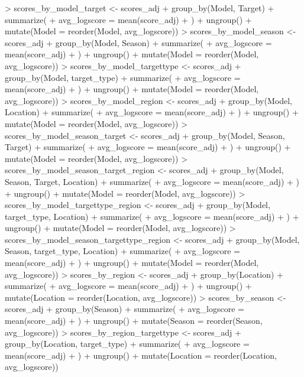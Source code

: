 \documentclass{article}
\begin{document}
\begin{Schunk}
\begin{Sinput}
> scores_by_model_target <- scores_adj %
+     group_by(Model, Target) %
+     summarize(
+         avg_logscore = mean(score_adj)
+     ) %
+     ungroup() %
+     mutate(Model = reorder(Model, avg_logscore))
> scores_by_model_season <- scores_adj %
+     group_by(Model, Season) %
+     summarize(
+         avg_logscore = mean(score_adj)
+     ) %
+     ungroup() %
+     mutate(Model = reorder(Model, avg_logscore))
> scores_by_model_targettype <- scores_adj %
+     group_by(Model, target_type) %
+     summarize(
+         avg_logscore = mean(score_adj)
+     ) %
+     ungroup() %
+     mutate(Model = reorder(Model, avg_logscore))
> scores_by_model_region <- scores_adj %
+     group_by(Model, Location) %
+     summarize(
+         avg_logscore = mean(score_adj)
+     ) %
+     ungroup() %
+     mutate(Model = reorder(Model, avg_logscore))
> scores_by_model_season_target <- scores_adj %
+     group_by(Model, Season, Target) %
+     summarize(
+         avg_logscore = mean(score_adj)
+     ) %
+     ungroup() %
+     mutate(Model = reorder(Model, avg_logscore))
> scores_by_model_season_target_region <- scores_adj %
+     group_by(Model, Season, Target, Location) %
+     summarize(
+         avg_logscore = mean(score_adj)
+     ) %
+     ungroup() %
+     mutate(Model = reorder(Model, avg_logscore))
> scores_by_model_targettype_region <- scores_adj %
+     group_by(Model, target_type, Location) %
+     summarize(
+         avg_logscore = mean(score_adj)
+     ) %
+     ungroup() %
+     mutate(Model = reorder(Model, avg_logscore))
> scores_by_model_season_targettype_region <- scores_adj %
+     group_by(Model, Season, target_type, Location) %
+     summarize(
+         avg_logscore = mean(score_adj)
+     ) %
+     ungroup() %
+     mutate(Model = reorder(Model, avg_logscore))
> scores_by_region <- scores_adj %
+     group_by(Location) %
+     summarize(
+         avg_logscore = mean(score_adj)
+     ) %
+     ungroup() %
+     mutate(Location = reorder(Location, avg_logscore))
> scores_by_season <- scores_adj %
+     group_by(Season) %
+     summarize(
+         avg_logscore = mean(score_adj)
+     ) %
+     ungroup() %
+     mutate(Season = reorder(Season, avg_logscore))
> scores_by_region_targettype <- scores_adj %
+     group_by(Location, target_type) %
+     summarize(
+         avg_logscore = mean(score_adj)
+     ) %
+     ungroup() %
+     mutate(Location = reorder(Location, avg_logscore))
\end{Sinput}
\end{Schunk}
\end{document}
